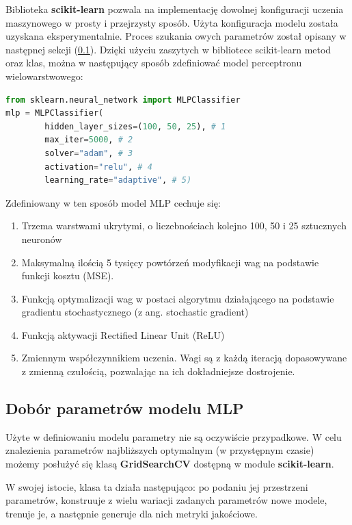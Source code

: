 Biblioteka \textbf{scikit-learn} pozwala na implementację dowolnej konfiguracji uczenia maszynowego w prosty i przejrzysty sposób. Użyta konfiguracja modelu została uzyskana eksperymentalnie. Proces szukania owych parametrów został opisany w następnej sekcji (\ref{sec:grid}). Dzięki użyciu zaszytych w bibliotece scikit-learn metod oraz klas, można w następujący sposób zdefiniować model perceptronu wielowarstwowego:

\begin{lstlisting}[language=Python, caption=Definiowanie modelu MLP]
from sklearn.neural_network import MLPClassifier
mlp = MLPClassifier(
        hidden_layer_sizes=(100, 50, 25), # 1
        max_iter=5000, # 2
        solver="adam", # 3
        activation="relu", # 4
        learning_rate="adaptive", # 5)
\end{lstlisting}

\null{}

Zdefiniowany w ten sposób model MLP cechuje się:
\begin{enumerate}
    \item Trzema warstwami ukrytymi, o liczebnościach kolejno 100, 50 i 25 sztucznych neuronów
    \item Maksymalną ilością 5 tysięcy powtórzeń modyfikacji wag na podstawie funkcji kosztu (MSE).
    \item Funkcją optymalizacji wag w postaci algorytmu działającego na podstawie gradientu stochastycznego (z ang. stochastic gradient)
    \item Funkcją aktywacji Rectified Linear Unit (ReLU)
    \item Zmiennym współczynnikiem uczenia. Wagi są z każdą iteracją dopasowywane z zmienną czułością, pozwalając na ich dokładniejsze dostrojenie.
\end{enumerate}

\subsection{Dobór parametrów modelu MLP}
\label{sec:grid}

Użyte w definiowaniu modelu parametry nie są oczywiście przypadkowe. W celu znalezienia parametrów najbliższych optymalnym (w przystępnym czasie) możemy posłużyć się klasą \textbf{GridSearchCV} dostępną w module \textbf{scikit-learn}. 

W swojej istocie, klasa ta działa następująco: po podaniu jej przestrzeni parametrów, konstruuje z wielu wariacji zadanych parametrów nowe modele, trenuje je, a następnie generuje dla nich metryki jakościowe. 

